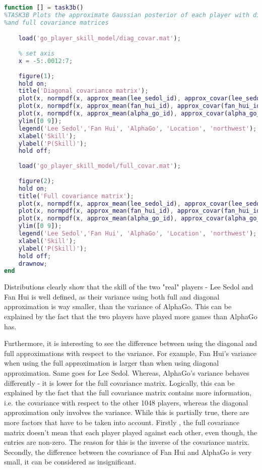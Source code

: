 \documentclass[a4paper,11pt]{article}
\theoremstyle{mytheor}
\begin{document}
\begin{lstlisting}[label={list:3b},caption=Code for plotting approximate marginal posterior using full and diagonal approximations,language=MATLAB]
function [] = task3b()
%TASK3B Plots the approximate Gaussian posterior of each player with diagonal
%and full covariance matrices

    load('go_player_skill_model/diag_covar.mat');
    
    % set axis
    x = -5:.0012:7;
    
    figure(1);
    hold on;
    title('Diagonal covariance matrix');
    plot(x, normpdf(x, approx_mean(lee_sedol_id), approx_covar(lee_sedol_id)^0.5),'-r');
    plot(x, normpdf(x, approx_mean(fan_hui_id), approx_covar(fan_hui_id)^0.5),'--g');
    plot(x, normpdf(x, approx_mean(alpha_go_id), approx_covar(alpha_go_id)^0.5),'-.b');
    ylim([0 9]);
    legend('Lee Sedol','Fan Hui', 'AlphaGo', 'Location', 'northwest');
    xlabel('Skill');
    ylabel('P(Skill)');
    hold off;
    
    load('go_player_skill_model/full_covar.mat');
    
    figure(2);
    hold on;
    title('Full covariance matrix');
    plot(x, normpdf(x, approx_mean(lee_sedol_id), approx_covar(lee_sedol_id,lee_sedol_id)^0.5),'-r');
    plot(x, normpdf(x, approx_mean(fan_hui_id), approx_covar(fan_hui_id,fan_hui_id)^0.5),'--g');
    plot(x, normpdf(x, approx_mean(alpha_go_id), approx_covar(alpha_go_id,alpha_go_id)^0.5),'-.b');
    ylim([0 9]);
    legend('Lee Sedol','Fan Hui', 'AlphaGo', 'Location', 'northwest');
    xlabel('Skill');
    ylabel('P(Skill)');
    hold off;
    drawnow;
end

\end{lstlisting}

Distributions clearly show that the skill of the two "real" players - Lee Sedol and Fan Hui is well defined, as their variance using both full and diagonal approximation is way smaller, than the variance of AlphaGo. This can be explained by the fact that the two players have played more games than AlphaGo has.

Furthermore, it is interesting to see the difference between using the diagonal and full approximations with respect to the variance. For example, Fan Hui's variance when using the full approximation is larger than when using diagonal approximation. Same goes for Lee Sedol. Whereas, AlphaGo's variance behaves differently - it is lower for the full covariance matrix. Logically, this can be explained by the fact that the full covariance matrix contains more information, i.e. the covariance with respect to the other 1048 players, whereas the diagonal approximation only involves the variance. While this is partially true, there are more factors that have to be taken into account. Firstly , the full covariance matrix doesn't mean that each player played against each other, even though, the entries are non-zero. The reason for this is the inverse of the covariance matrix. Secondly, the difference between the covariance of Fan Hui and AlphaGo is very small, it can be considered as insignificant.
\end{document}
